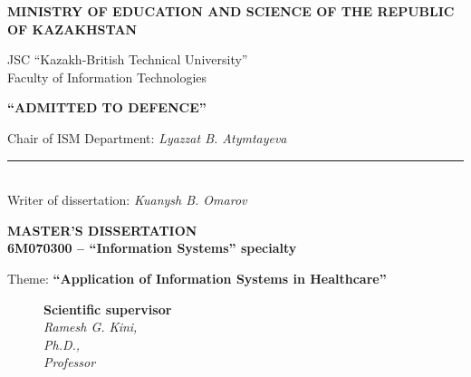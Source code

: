 \begin{titlepage}
    \pagestyle{empty}
    \begin{center}
        {\bf{\MakeUppercase{Ministry of education and science of the republic of Kazakhstan}}

        \vspace{14pt}

        JSC ``Kazakh-British Technical University''\\
        Faculty of Information Technologies}

       \vspace{14pt}

        \begin{flushright}
            {\bf \MakeUppercase{``Admitted to defence''}}

            Chair of ISM Department: {\em Lyazzat B. Atymtayeva}\\
            \vspace{0.5\baselineskip}
            \rule{13em}{0.4pt}\\
            \vspace{14pt}
          Writer of dissertation: {\em Kuanysh B. Omarov}
          \vspace{14pt}
        \end{flushright}

        {\bf
        \MakeUppercase{Master's Dissertation}\\
        6M070300 -- ``Information Systems'' specialty}

        \vspace{14pt}

        Theme: {\bf ``Application of Information Systems in Healthcare''}

        \vspace{28pt}

        \begin{figure}[ht]
            \begin{minipage}[t]{0.6\linewidth}
                {\bf Scientific supervisor}\\

                {\em Ramesh G. Kini,\\
                Ph.D., \\
                Professor}\\
            \end{minipage}
        \end{figure}


\end{center}
\end{titlepage}
